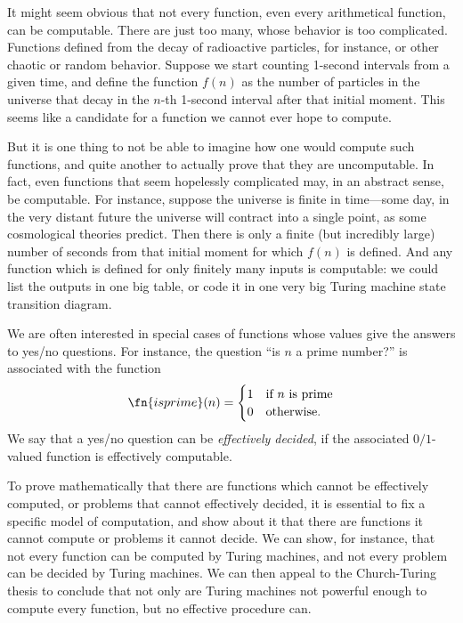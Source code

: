 \documentclass[../../../include/open-logic-section]{subfiles}
\begin{document}

It might seem obvious that not every function, even every arithmetical
function, can be computable. There are just too many, whose behavior
is too complicated.  Functions defined from the decay of radioactive
particles, for instance, or other chaotic or random behavior. Suppose
we start counting 1-second intervals from a given time, and define the
function $f(n)$ as the number of particles in the universe that decay
in the $n$-th 1-second interval after that initial moment.  This seems
like a candidate for a function we cannot ever hope to compute.

But it is one thing to not be able to imagine how one would compute
such functions, and quite another to actually prove that they are
uncomputable.  In fact, even functions that seem hopelessly
complicated may, in an abstract sense, be computable.  For instance,
suppose the universe is finite in time---some day, in the very distant
future the universe will contract into a single point, as some
cosmological theories predict. Then there is only a finite (but
incredibly large) number of seconds from that initial moment for which
$f(n)$ is defined.  And any function which is defined for only finitely
many inputs is computable: we could list the outputs in one big table,
or code it in one very big Turing machine state transition diagram.

We are often interested in special cases of functions whose values give
the answers to yes/no questions.  For instance, the question ``is $n$
a prime number?'' is associated with the function
\[
\fn{isprime}(n) = \begin{cases}
  1 & \text{if $n$ is prime}\\
  0 & \text{otherwise.}
  \end{cases}
\]
We say that a yes/no question can be \emph{effectively decided}, if
the associated $0/1$-valued function is effectively computable.

To prove mathematically that there are functions which cannot be
effectively computed, or problems that cannot effectively decided, it
is essential to fix a specific model of computation, and show about it
that there are functions it cannot compute or problems it cannot
decide.  We can show, for instance, that not every function can be
computed by Turing machines, and not every problem can be decided by
Turing machines.  We can then appeal to the Church-Turing thesis to
conclude that not only are Turing machines not powerful enough to
compute every function, but no effective procedure can.
\end{document}
